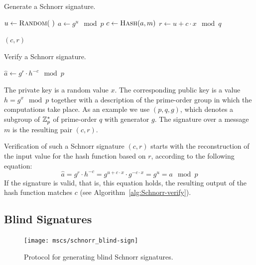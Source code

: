 \begin{algorithm}
  \caption{Generate a Schnorr signature.}
  \label{alg:Schnorr-sign}
  \addtolength{\baselineskip}{1mm}
  \begin{algorithmic}[1]
      \State $u \gets \Call{Random}{~}$
      \State $a \gets g^u \mod p$
      \State $c \gets \Call{Hash}{a, m}$
      \State $r \gets u + c \cdot x \mod q$

      \Return $(c, r)$
    \EndFunction
  \end{algorithmic}
\end{algorithm}
\begin{algorithm}
  \caption{Verify a Schnorr signature.}
  \label{alg:Schnorr-verify}
  \addtolength{\baselineskip}{1mm}
  \begin{algorithmic}[1]
      \State $\hat{a} \gets g^r \cdot h^{-c} \mod p$

        \Return {}
      \EndIf

      \Return {}
    \EndFunction
  \end{algorithmic}
\end{algorithm}

The private key is a random value $x$. The corresponding public key is a value
$h = g^x \mod p$ together with a description of the prime-order group in which
the computations take place. As an example we use $(p, q, g)$, which denotes a
subgroup of $\mathbb{Z}^*_p$ of prime-order $q$ with generator $g$. The signature over
a message $m$ is the resulting pair $(c, r)$.

Verification of such a Schnorr signature $(c, r)$ starts with the reconstruction
of the input value for the hash function based on $r$, according to the
following equation:
\begin{equation}\label{eqn:Schnorr-verify}
  \hat{a} = g^r \cdot h^{-c} = g^{u + c \cdot x} \cdot g^{-c \cdot x} = g^u = a \mod p
\end{equation}
If the signature is valid, that is, this equation holds, the resulting output of
the hash function matches $c$ (see Algorithm~\ref{alg:Schnorr-verify}).

\subsection{Blind Signatures}

\begin{figure}[ht]
  \centering
  \texttt{[image: mscs/schnorr\_blind-sign]}
  \caption{Protocol for generating blind Schnorr signatures.}
  \label{msc:schnorr_blind-sign}
\end{figure}


